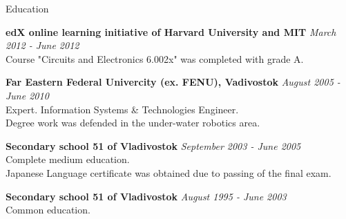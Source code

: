 \documentclass{resume}
\begin{document}

\begin{rSection}{Education}

{\bf edX online learning initiative of Harvard University and MIT} \hfill {\em March 2012 - June 2012} \\
Course "Circuits and Electronics 6.002x" was completed with grade A.

{\bf Far Eastern Federal Univercity (ex. FENU), Vadivostok} \hfill {\em August 2005 - June 2010} \\ 
Expert. Information Systems \& Technologies Engineer. \\
Degree work was defended in the under-water robotics area.

{\bf Secondary school 51 of Vladivostok} \hfill {\em September 2003  - June 2005} \\
Complete medium education. \\
Japanese Language certificate was obtained due to passing of the final exam.

{\bf Secondary school 51 of Vladivostok} \hfill {\em August 1995 - June 2003} \\
Common education.

\end{rSection}

\end{document}
